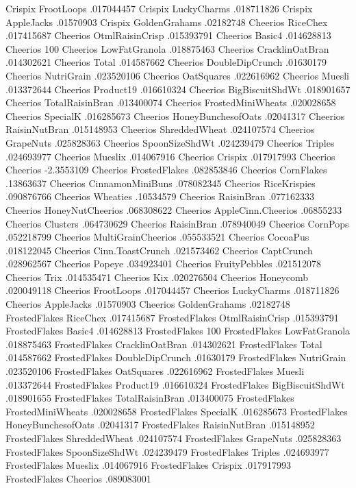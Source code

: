Crispix	FrootLoops	.017044457
Crispix	LuckyCharms	.018711826
Crispix	AppleJacks	.01570903
Crispix	GoldenGrahams	.02182748
Cheerios	RiceChex	.017415687
Cheerios	OtmlRaisinCrisp	.015393791
Cheerios	Basic4	.014628813
Cheerios	100%
Cheerios	LowFatGranola	.018875463
Cheerios	CracklinOatBran	.014302621
Cheerios	Total	.014587662
Cheerios	DoubleDipCrunch	.01630179
Cheerios	NutriGrain	.023520106
Cheerios	OatSquares	.022616962
Cheerios	Muesli	.013372644
Cheerios	Product19	.016610324
Cheerios	BigBiscuitShdWt	.018901657
Cheerios	TotalRaisinBran	.013400074
Cheerios	FrostedMiniWheats	.020028658
Cheerios	SpecialK	.016285673
Cheerios	HoneyBunchesofOats	.02041317
Cheerios	RaisinNutBran	.015148953
Cheerios	ShreddedWheat	.024107574
Cheerios	GrapeNuts	.025828363
Cheerios	SpoonSizeShdWt	.024239479
Cheerios	Triples	.024693977
Cheerios	Mueslix	.014067916
Cheerios	Crispix	.017917993
Cheerios	Cheerios	-2.3553109
Cheerios	FrostedFlakes	.082853846
Cheerios	CornFlakes	.13863637
Cheerios	CinnamonMiniBuns	.078082345
Cheerios	RiceKrispies	.090876766
Cheerios	Wheaties	.10534579
Cheerios	RaisinBran	.077162333
Cheerios	HoneyNutCheerios	.068308622
Cheerios	AppleCinn.Cheerios	.06855233
Cheerios	Clusters	.064730629
Cheerios	RaisinBran	.078940049
Cheerios	CornPops	.052218799
Cheerios	MultiGrainCheerios	.055533521
Cheerios	CocoaPus	.018122045
Cheerios	Cinn.ToastCrunch	.021573462
Cheerios	CaptCrunch	.028962567
Cheerios	Popeye	.034923401
Cheerios	FruityPebbles	.021512078
Cheerios	Trix	.014535471
Cheerios	Kix	.020276504
Cheerios	Honeycomb	.020049118
Cheerios	FrootLoops	.017044457
Cheerios	LuckyCharms	.018711826
Cheerios	AppleJacks	.01570903
Cheerios	GoldenGrahams	.02182748
FrostedFlakes	RiceChex	.017415687
FrostedFlakes	OtmlRaisinCrisp	.015393791
FrostedFlakes	Basic4	.014628813
FrostedFlakes	100%
FrostedFlakes	LowFatGranola	.018875463
FrostedFlakes	CracklinOatBran	.014302621
FrostedFlakes	Total	.014587662
FrostedFlakes	DoubleDipCrunch	.01630179
FrostedFlakes	NutriGrain	.023520106
FrostedFlakes	OatSquares	.022616962
FrostedFlakes	Muesli	.013372644
FrostedFlakes	Product19	.016610324
FrostedFlakes	BigBiscuitShdWt	.018901655
FrostedFlakes	TotalRaisinBran	.013400075
FrostedFlakes	FrostedMiniWheats	.020028658
FrostedFlakes	SpecialK	.016285673
FrostedFlakes	HoneyBunchesofOats	.02041317
FrostedFlakes	RaisinNutBran	.015148952
FrostedFlakes	ShreddedWheat	.024107574
FrostedFlakes	GrapeNuts	.025828363
FrostedFlakes	SpoonSizeShdWt	.024239479
FrostedFlakes	Triples	.024693977
FrostedFlakes	Mueslix	.014067916
FrostedFlakes	Crispix	.017917993
FrostedFlakes	Cheerios	.089083001
